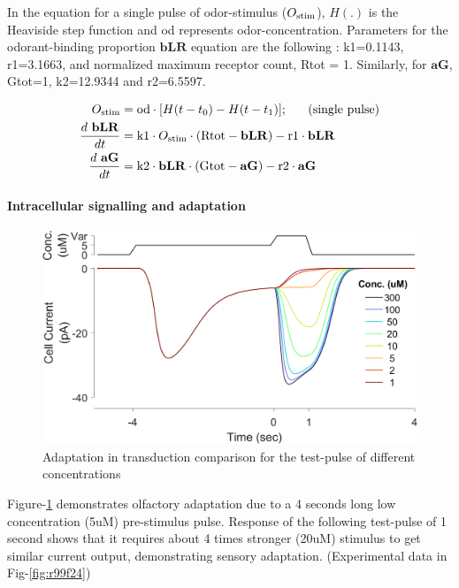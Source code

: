 \documentclass[
]{article}
\begin{document}
In the equation for a single pulse of odor-stimulus (\(O_{\rm stim}\)), \(H(.)\) is the Heaviside step function and od represents odor-concentration. Parameters for the odorant-binding proportion \(\mathbf{bLR}\) equation are the following : k1=0.1143, r1=3.1663, and normalized maximum receptor count, Rtot = 1. Similarly, for \(\mathbf{aG}\), Gtot=1, k2=12.9344 and r2=6.5597.

\begin{equation}\label{eq:tx1}
\begin{split}
O_{\rm stim} &= {\rm od} \cdot [ H(t-t_0) - H(t-t_1) ];\ \ \ \ \  \text{(single pulse)}  \\
\frac{d\ \mathbf{bLR}}{dt} &= {\rm k1} \cdot O_{\rm stim} \cdot ({\rm Rtot} - \mathbf{bLR}) - {\rm r1} \cdot \mathbf{bLR} \\
\frac{d\ \mathbf{aG}}{dt} &= {\rm k2} \cdot \mathbf{bLR} \cdot ({\rm Gtot} - \mathbf{aG}) - {\rm r2} \cdot \mathbf{aG}
\end{split}
\end{equation}

\hypertarget{intracellular-signalling-and-adaptation}{%
\paragraph*{Intracellular signalling and adaptation}\label{intracellular-signalling-and-adaptation}}

\begin{figure}

{\centering \includegraphics[width=0.7\linewidth]{figs/v1/fig_txn_compare_adaptation} 

}

\caption{Adaptation in transduction comparison for the test-pulse of different concentrations}\label{fig:txAdp}
\end{figure}

Figure-\ref{fig:txAdp} demonstrates olfactory adaptation due to a 4 seconds long low concentration (5uM) pre-stimulus pulse. Response of the following test-pulse of 1 second shows that it requires about 4 times stronger (20uM) stimulus to get similar current output, demonstrating sensory adaptation. (Experimental data in Fig-\ref{fig:r99f24})
\end{document}
